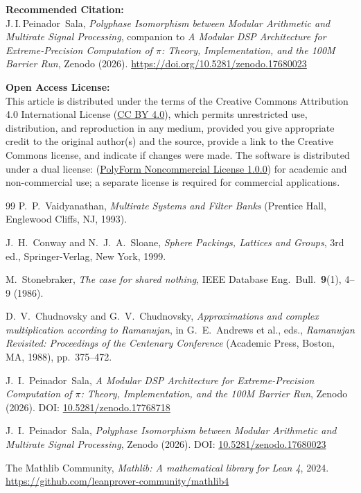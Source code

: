 \documentclass{mcom-l} %
\theoremstyle{plain} %
\theoremstyle{definition} %
\theoremstyle{remark} %
\begin{document}
\noindent\textbf{Recommended Citation:} \\
J.\,I.\,Peinador~Sala, \emph{Polyphase Isomorphism between Modular Arithmetic and Multirate Signal Processing}, companion to \emph{A Modular DSP Architecture for Extreme-Precision Computation of \(\pi\): Theory, Implementation, and the 100M Barrier Run}, Zenodo (2026). \url{https://doi.org/10.5281/zenodo.17680023}

\vspace{1em}
\noindent\textbf{Open Access License:} \\
This article is distributed under the terms of the Creative Commons Attribution 4.0 International License (\href{https://creativecommons.org/licenses/by/4.0/}{CC BY 4.0}), which permits unrestricted use, distribution, and reproduction in any medium, provided you give appropriate credit to the original author(s) and the source, provide a link to the Creative Commons license, and indicate if changes were made.
The software is distributed under a dual license: (\href{https://polyformproject.org/licenses/noncommercial/1.0.0}{PolyForm Noncommercial License 1.0.0}) for academic and non-commercial use; a separate license is required for commercial applications.

\begin{thebibliography}{99}
P.~P.~Vaidyanathan, 
\emph{Multirate Systems and Filter Banks} 
(Prentice Hall, Englewood Cliffs, NJ, 1993).

J.~H.~Conway and N.~J.~A.~Sloane, 
\emph{Sphere Packings, Lattices and Groups}, 
3rd ed., Springer-Verlag, New York, 1999. 

M.~Stonebraker, 
\emph{The case for shared nothing}, 
IEEE Database Eng.\ Bull.\ \textbf{9}(1), 4--9 (1986).

D.~V.~Chudnovsky and G.~V.~Chudnovsky, 
\emph{Approximations and complex multiplication according to Ramanujan}, 
in G.~E.~Andrews et al., eds., 
\emph{Ramanujan Revisited: Proceedings of the Centenary Conference} 
(Academic Press, Boston, MA, 1988), pp.~375--472.

J.~I.~Peinador~Sala, 
\emph{A Modular DSP Architecture for Extreme-Precision Computation of \(\pi\): Theory, Implementation, and the 100M Barrier Run}, 
Zenodo (2026). 
DOI: \href{https://doi.org/10.5281/zenodo.17768718}{10.5281/zenodo.17768718}

J.~I.~Peinador~Sala, 
\emph{Polyphase Isomorphism between Modular Arithmetic and Multirate Signal Processing}, 
Zenodo (2026).
DOI: \href{https://doi.org/10.5281/zenodo.17680023}{10.5281/zenodo.17680023}

The Mathlib Community, 
\emph{Mathlib: A mathematical library for Lean 4}, 
2024. 
\url{https://github.com/leanprover-community/mathlib4}
\end{thebibliography}
\end{document}

